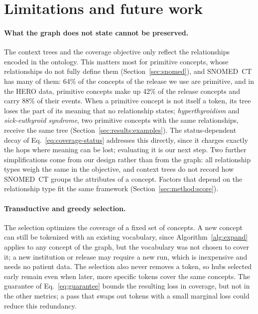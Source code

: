 \section{Limitations and future work}
\label{sec:limitations}

\paragraph{What the graph does not state cannot be preserved.}
The context trees and the coverage objective only reflect the relationships encoded in the ontology.
This matters most for primitive concepts, whose relationships do not fully define them (Section~\ref{sec:snomed}), and SNOMED~CT has many of them: 64\% of the concepts of the release we use are primitive, and in the HERO data, primitive concepts make up 42\% of the release concepts and carry 88\% of their events.
When a primitive concept is not itself a token, its tree loses the part of its meaning that no relationship states; \textit{hyperthyroidism} and \textit{sick-euthyroid syndrome}, two primitive concepts with the same relationships, receive the same tree (Section~\ref{sec:results:examples}).
The status-dependent decay of Eq.~\eqref{eq:coverage-status} addresses this directly, since it charges exactly the hops where meaning can be lost; evaluating it is our next step.
Two further simplifications come from our design rather than from the graph: all relationship types weigh the same in the objective, and context trees do not record how SNOMED~CT groups the attributes of a concept.
Factors that depend on the relationship type fit the same framework (Section~\ref{sec:method:score}).

\paragraph{Transductive and greedy selection.}
The selection optimizes the coverage of a fixed set of concepts.
A new concept can still be tokenized with an existing vocabulary, since Algorithm~\ref{alg:expand} applies to any concept of the graph, but the vocabulary was not chosen to cover it; a new institution or release may require a new run, which is inexpensive and needs no patient data.
The selection also never removes a token, so hubs selected early remain even when later, more specific tokens cover the same concepts.
The guarantee of Eq.~\eqref{eq:guarantee} bounds the resulting loss in coverage, but not in the other metrics; a pass that swaps out tokens with a small marginal loss could reduce this redundancy.

